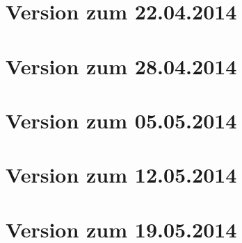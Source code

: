 \section{Version zum 22.04.2014}

\section{Version zum 28.04.2014}

\section{Version zum 05.05.2014}

\section{Version zum 12.05.2014}

\section{Version zum 19.05.2014}



